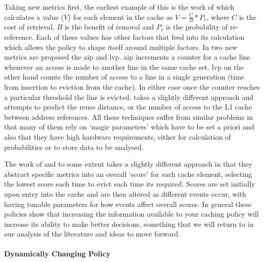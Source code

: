 Taking new metrics first, the earliest example of this is the work of  \citet{rizzoReplacementPoliciesProxy2000} which calculates a value ($V$) for each element in the cache as $V = \frac{C}{B}*P_r$, where $C$ is the cost of retrieval, $B$ is the benefit of removal and $P_r$ is the probability of re-reference. Each of these values has other factors that feed into its calculation which allows the policy to shape itself around multiple factors. In \citet{kharbutliCounterBasedCacheReplacement2005} two new metrics are proposed the \gls{aip} and \gls{lvp}. \gls{aip} increments a counter for a cache line whenever an access is made to another line in the same cache set. \gls{lvp} on the other hand counts the number of access to a line in a single generation (time from insertion to eviction from the cache). In either case once the counter reaches a particular threshold the line is evicted. \citet{keramidasCacheReplacementBased2007} takes a slightly different approach and attempts to predict the reuse distance, or the number of access to the L1 cache between address references. All these techniques suffer from similar problems in that many of them rely on `magic parameters' which have to be set a priori and also that they have high hardware requirements, either for calculation of probabilities or to store data to be analysed. 

The work of \citet{duongSCOREScoreBasedMemory2010} and to some extent \citet{tadaCacheReplacementPolicy2019} takes a slightly different approach in that they abstract specific metrics into an overall `score' for each cache element, selecting the lowest score each time to evict each time its required. Scores are set initially upon entry into the cache and are then altered as different events occur, with \citet{duongSCOREScoreBasedMemory2010} having tunable parameters for how events affect overall scores. In general these policies show that increasing the information available to your caching policy will increase its ability to make better decisions, something that we will return to in our analysis of the literature and ideas to move forward.

\paragraph{Dynamically Changing Policy}

